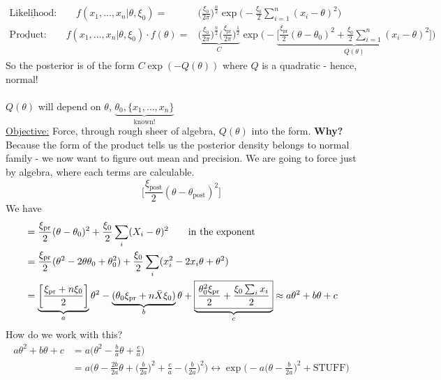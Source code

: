 \begin{align*}
	\underline{\text{Likelihood:}} \qquad f(x_1, \ldots, x_n | \theta, \xi_0) = & \bigg(\frac{\xi_0}{2\pi} \bigg)^{\frac{n}{2}} \exp\bigg( -\frac{\xi_0}{2} \sum_{i=1}^n  (x_i - \theta)^2 \bigg)\\
	\underline{\text{Product:}} \qquad f(x_1, \ldots, x_n | \theta, \xi_0) \cdot f(\theta) = & \underbrace{\bigg(\frac{\xi_0}{2\pi} \bigg)^{\frac{n}{2}} \bigg(\frac{\xi_{\text{pr}}}{2\pi} \bigg)^{\frac{1}{2}}}_{C} \exp \bigg(  - \underbrace{\bigg[\frac{\xi_{\text{pr}}}{2}(\theta - \theta_0)^2 + \frac{\xi_0}{2}  \sum_{i=1}^n  (x_i - \theta)^2 \bigg]}_{Q(\theta)} \bigg)
\end{align*}
So the posterior is of the form $C \exp (-Q(\theta))$ where $Q$ is a quadratic - hence, normal!\\\\
$Q(\theta)$ will depend on $\theta$, $\underbrace{\theta_0, \{x_1, \ldots, x_n\}}_{\text{known!}}$\\
\underline{Objective:} Force, through rough sheer of algebra, $Q(\theta)$ into the form. \textbf{Why?} Because the form of the product tells us the posterior density belongs to normal family - we now want to figure out mean and precision. We are going to force just by algebra, where each terms are calculable. 
\begin{equation*}
	\bigg[ \frac{\xi_{\text{post}}}{2} (\theta - \theta_{\text{post}})^2 \bigg]
\end{equation*}
We have
\begin{align*}
	& = \frac{\xi_{\text{pr}}}{2} (\theta - \theta_0)^2 + \frac{\xi_0}{2}\sum_i (X_i - \theta)^2 \qquad \text{in the exponent}\\
	& = \frac{\xi_{\text{pr}}}{2} (\theta^2 - 2 \theta \theta_0 + \theta_0^2) + \frac{\xi_0}{2}\sum_i (x_i^2 - 2 x_i \theta + \theta^2)\\
	& = \underbrace{\bigg[\frac{\xi_{\text{pr}} + n \xi_0}{2}\bigg]}_{a} \theta^2 - \underbrace{(\theta_0 \xi_{\text{pr}} + n \bar{X} \xi_0)}_{b} \theta + \underbrace{\boxed{\frac{\theta_0^2 \xi_{\text{pr}}}{2} + \frac{\xi_0 \sum_i x_i }{2}}}_{c} \approx a\theta^2 + b\theta + c
\end{align*}
How do we work with this? 
\begin{align*}
	a\theta^2 + b\theta + c & = a \bigg(\theta^2 - \frac{b}{a} \theta + \frac{c}{a}\bigg)\\
	& = a \bigg(\theta - \frac{2b}{2a}\theta + \bigg(\frac{b}{2a} \bigg)^2 + \frac{c}{a} - \bigg(\frac{b}{2a} \bigg)^2 \bigg) \leftrightarrow \boxed{\exp\bigg(-a \bigg( \theta - \frac{b}{2a} \bigg)^2} + \text{STUFF} \bigg) 
\end{align*}
